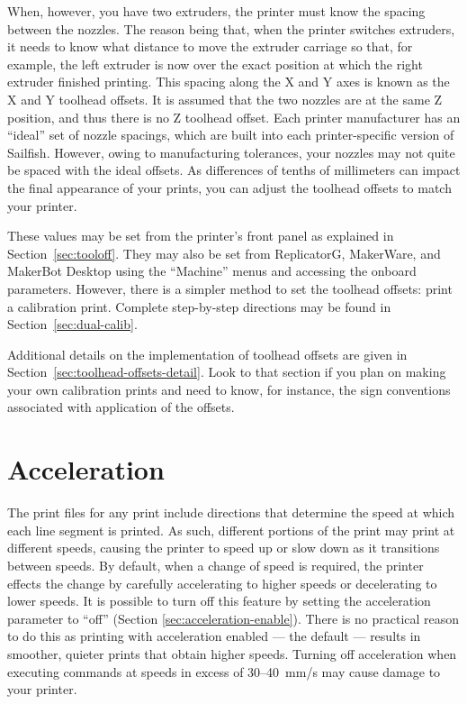 When, however, you have two extruders, the printer must know the spacing between the nozzles.  The reason being that, when the printer switches extruders, it needs to know what distance to move the extruder carriage so that, for example, the left extruder is now over the exact position at which the right extruder finished printing.  This spacing along the X and Y axes is known as the X and Y toolhead offsets.  It is assumed that the two nozzles are at the same Z position, and thus there is no Z toolhead offset.  Each printer manufacturer has an ``ideal'' set of nozzle spacings, which are built into each printer-specific version of Sailfish.  However, owing to manufacturing tolerances, your nozzles may not quite be spaced with the ideal offsets.  As differences of tenths of millimeters can impact the final appearance of your prints, you can adjust the toolhead offsets to match your printer.

These values may be set from the printer's front panel as explained in Section~\ref{sec:tooloff}.  They may also be set from ReplicatorG, MakerWare, and MakerBot Desktop using the ``Machine'' menus and accessing the onboard parameters.  However, there is a simpler method to set the toolhead offsets: print a calibration print.  Complete step-by-step directions may be found in Section~\ref{sec:dual-calib}.

Additional details on the implementation of toolhead offsets are given in Section~\ref{sec:toolhead-offsets-detail}.  Look to that section if you plan on making your own calibration prints and need to know, for instance, the sign conventions associated with application of the offsets.


\section{Acceleration}

The print files for any print include directions that determine the speed at which each line segment is printed.  As such, different portions of the print may print at different speeds, causing the printer to speed up or slow down as it transitions between speeds.  By default, when a change of speed is required, the printer effects the change by carefully accelerating to higher speeds or decelerating to lower speeds.  It is possible to turn off this feature by setting the acceleration parameter to ``off'' (Section \ref{sec:acceleration-enable}).  There is no practical reason to do this as printing with acceleration enabled --- the default --- results in smoother, quieter prints that obtain higher speeds.  Turning off acceleration when executing commands at speeds in excess of 30--40~mm/s may cause damage to your printer.

